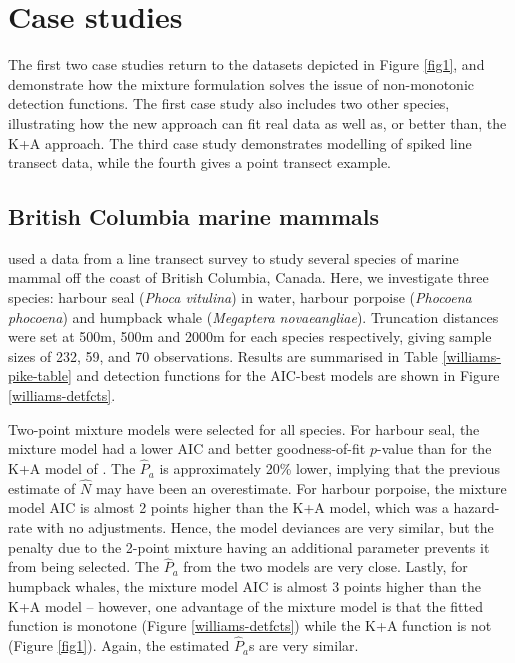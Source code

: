 \documentclass[useAMS,referee,usenatbib]{biom}
\begin{document}
\section{Case studies}
\label{s:data}

The first two case studies return to the datasets depicted in Figure \ref{fig1}, and demonstrate how the mixture formulation solves the issue of non-monotonic detection functions.  The first case study also includes two other species, illustrating how the new approach can fit real data as well as, or better than, the K+A approach.  The third case study demonstrates modelling of spiked line transect data, while the fourth gives a point transect example.

\subsection{British Columbia marine mammals}

\cite{Williams:2007tc} used a data from a line transect survey to study several species of marine mammal off the coast of British Columbia, Canada. Here, we investigate three species: harbour seal (\textit{Phoca vitulina}) in water, harbour porpoise (\textit{Phocoena phocoena}) and humpback whale (\textit{Megaptera novaeangliae}). Truncation distances were set at 500m, 500m and 2000m for each species respectively, giving sample sizes of 232, 59, and 70 observations. Results are summarised in Table \ref{williams-pike-table} and detection functions for the AIC-best models are shown in Figure \ref{williams-detfcts}.

Two-point mixture models were selected for all species.  For harbour seal, the mixture model had a lower AIC and better goodness-of-fit $p$-value than for the K+A model of \cite{Williams:2007tc}.  The $\hat{P}_a$ is approximately 20\% lower, implying that the previous estimate of $\hat{N}$ may have been an overestimate.  For harbour porpoise, the mixture model AIC is almost 2 points higher than the K+A model, which was a hazard-rate with no adjustments.  Hence, the model deviances are very similar, but the penalty due to the 2-point mixture having an additional parameter prevents it from being selected.  The $\hat{P}_a$ from the two models are very close.  Lastly, for humpback whales, the mixture model AIC is almost 3 points higher than the K+A model -- however, one advantage of the mixture model is that the fitted function is monotone (Figure \ref{williams-detfcts}) while the K+A function is not (Figure \ref{fig1}).  Again, the estimated $\hat{P}_a$s are very similar.
\end{document}

